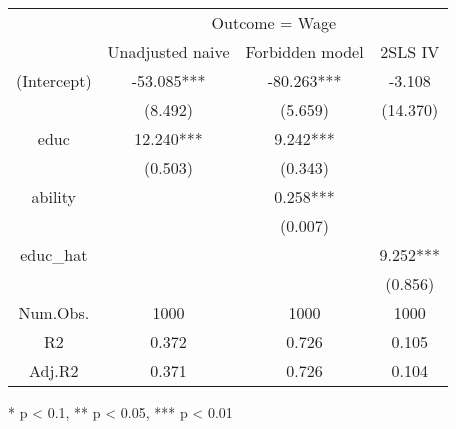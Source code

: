 \documentclass[20pt]{article}
\begin{document}

\setlength\LTleft{0.5in}
\setlength\LTright{0.5in}      

\begin{landscape}
\begingroup
\huge


\captionsetup[table]{font=normal,skip=0pt}
\begin{longtable}{@{\extracolsep{\fill}}cccc}
\toprule
& \multicolumn{3}{c}{Outcome = Wage} \\ 
 \cmidrule(lr){2-4}
        & Unadjusted naive & Forbidden model & 2SLS IV \\ 
\midrule\relax
(Intercept) & -53.085*** & -80.263*** & -3.108 \\ 
 & (8.492) & (5.659) & (14.370) \\ 
educ & 12.240*** & 9.242*** &  \\ 
 & (0.503) & (0.343) &  \\ 
ability &  & 0.258*** &  \\ 
 &  & (0.007) &  \\ 
educ\_hat &  &  & 9.252*** \\ 
 &  &  & (0.856) \\ 
\midrule
Num.Obs. & 1000 & 1000 & 1000 \\ 
R2 & 0.372 & 0.726 & 0.105 \\ 
Adj.R2 & 0.371 & 0.726 & 0.104 \\ 
\bottomrule
\end{longtable}
\begin{minipage}{\linewidth}
* p < 0.1, ** p < 0.05, *** p < 0.01\\ 
\end{minipage}

\endgroup
\end{landscape}
\end{document}
